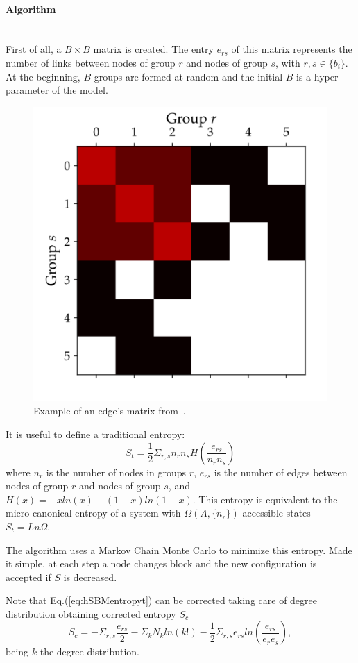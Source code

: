 \paragraph{Algorithm}\mbox{}\\
First of all, a $B\times B$ matrix is created. The entry $e_{rs}$ of this matrix represents the number of links between nodes of group $r$ and nodes of group $s$, with $r,s\in\{b_i\}$. At the beginning, $B$ groups are formed at random and the initial $B$ is a hyper-parameter of the model.
\begin{figure}[htb!]
  \centering
  \includegraphics[width=0.3\linewidth]{pictures/topic/peixioto_ers.pdf}
  \caption{Example of an edge's matrix from~\cite{peixoto_graph-tool_2014}.}
    \label{fig:hsbm-ers}
\end{figure}

It is useful to define a traditional entropy:
\begin{equation}\label{eq:hSBMentropyt}
  S_t=\frac{1}{2}\Sigma_{r,s} n_rn_sH\left(\frac{e_{rs}}{n_rn_s}\right)
\end{equation}
where $n_{r}$ is the number of nodes in groups $r$, $e_{rs}$ is the number of edges between nodes of group $r$ and nodes of group $s$, and $H(x)=-xln(x)-(1-x)ln(1-x)$. This entropy is equivalent to the micro-canonical entropy of a system with ${\Omega(A,\{n_r\})}$ accessible states $S_t=Ln\Omega$.

The algorithm uses a Markov Chain Monte Carlo to minimize this entropy. Made it simple, at each step a node changes block and the new configuration is accepted if $S$ is decreased.

Note that Eq.(\ref{eq:hSBMentropyt}) can be corrected taking care of degree distribution obtaining corrected entropy $S_c$
\begin{equation}
  S_c=-\Sigma_{r,s}\frac{e_{rs}}{2}-\Sigma_k
  N_kln(k!)-\frac{1}{2}\Sigma_{r,s}e_{rs}ln\left(\frac{e_{rs}}{e_re_s}\right),
\end{equation}
being $k$ the degree distribution.

